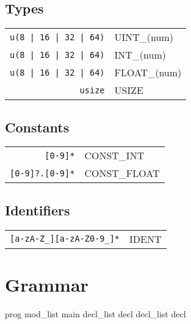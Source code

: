 \documentclass{article}
\begin{document}
		\subsection{Types}	
			\begin{tabular}{rl}
				\texttt{u(8 | 16 | 32 | 64)} & UINT\_(num)\\
				\texttt{u(8 | 16 | 32 | 64)} & INT\_(num)\\
				\texttt{u(8 | 16 | 32 | 64)}  & FLOAT\_(num)\\
				\texttt{usize} & USIZE\\ 
			\end{tabular}
		\subsection{Constants}
			\begin{tabular}{rl}
				\texttt{[0-9]*} & CONST\_INT\\
				\texttt{[0-9]?.[0-9]*} & CONST\_FLOAT\\
			\end{tabular}
		\subsection{Identifiers}
			\begin{tabular}{rl}
				\texttt{[a-zA-Z\_][a-zA-Z0-9\_]*} & IDENT\\
			\end{tabular}	
	\section{Grammar}
		

		prog
			mod\_list main 
		decl\_list
			decl decl\_list 
		decl 
\end{document}
